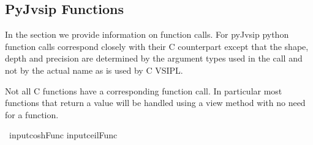 \subsection*{PyJvsip Functions}
In the \pyjv{}  section we provide information on function calls. For pyJvsip python function calls correspond closely with their C counterpart except that the shape, depth and precision are determined by the argument types used in the call and not by the actual name as is used by C VSIPL.

Not all C functions have a corresponding \pyjv{} function call. In particular most functions that return a value will be handled using a view method with no need for a function.
 













\
input{coshFunc}
input{ceilFunc}

































































